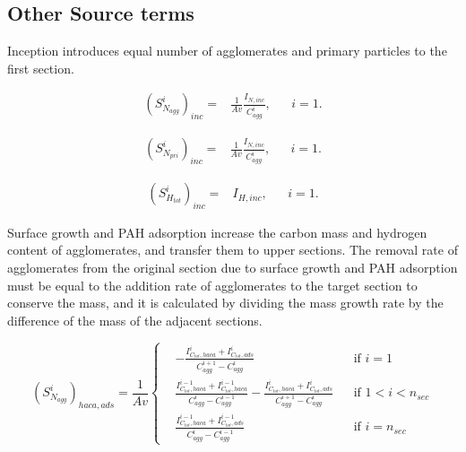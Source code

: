 \subsection{Other Source terms}
\label{sec:sectothersource}

Inception introduces equal number of agglomerates and primary particles to the first section.

\begin{equation}
	\begin{aligned}
		\left(S^i_{N_{agg}}\right)_{inc} =
		&\frac{1}{Av}\frac{I_{N, inc}}{C^i_{agg}}, && i=1.
	\end{aligned}
	\label{eqn:S_Nagg_incsect}
\end{equation}

\begin{equation}
	\begin{aligned}
		\left(S^i_{N_{pri}}\right)_{inc} =
		&\frac{1}{Av}\frac{I_{N, inc}}{C^i_{agg}}, && i=1.
	\end{aligned}
	\label{eqn:S_Npri_incsect}
\end{equation}

\begin{equation}
	\begin{aligned}
		\left(S^i_{H_{tot}}\right)_{inc} =
		&I_{H, inc}, && i=1.
	\end{aligned}
	\label{eqn:S_Htot_incsect}
\end{equation}

Surface growth and PAH adsorption increase the carbon mass and hydrogen content of agglomerates, and transfer them to upper sections. The removal rate of agglomerates from the original section due to surface growth and PAH adsorption must be equal to the addition rate of agglomerates to the target section to conserve the mass, and it is calculated by dividing the mass growth rate by the difference of the mass of the adjacent sections.

\begin{equation}
	\left(S^i_{N_{agg}}\right)_{haca, ads}=
	\frac{1}{Av}
	\left\{
	\begin{aligned}
		&-\frac{I^i_{C_{tot},haca}+I^i_{C_{tot},ads}}{C^{i+1}_{agg}-C^{i}_{agg}}
		&&
		\text{if } i = 1
		\\
		&\frac{I^{i-1}_{C_{tot},haca}+I^{i-1}_{C_{tot},haca}}{C^{i}_{agg}-C^{i-1}_{agg}}
		-\frac{I^{i}_{C_{tot},haca}+I^{i}_{C_{tot},ads}}{C^{i+1}_{agg}-C^{i}_{agg}}
		&&
		\text{if } 1 < i < n_{sec}
		\\
		&\frac{I^{i-1}_{C_{tot},haca}+I^{i-1}_{C_{tot},ads}}{C^{i}_{agg}-C^{i-1}_{agg}}
		&&\text{if } i=n_{sec}
	\end{aligned}
	\right.
	\label{eqn:S_Nagg_gradssect}
\end{equation}

